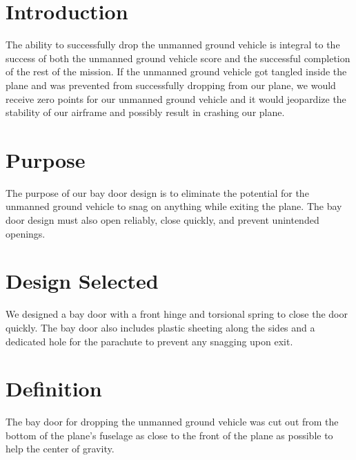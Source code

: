 \documentclass[]{auvsi_doc}
\begin{document}
\begin{AUVSITitlePage}
\begin{artifacttable}
\end{artifacttable}
\end{AUVSITitlePage}

\section{Introduction}

The ability to successfully drop the unmanned ground vehicle is integral to the success of both the unmanned ground vehicle score and the successful completion of the rest of the mission. If the unmanned ground vehicle got tangled inside the plane and was prevented from successfully dropping from our plane, we would receive zero points for our unmanned ground vehicle and it would jeopardize the stability of our airframe and possibly result in crashing our plane.

\section{Purpose}

The purpose of our bay door design is to eliminate the potential for the unmanned ground vehicle to snag on anything while exiting the plane. The bay door design must also open reliably, close quickly, and prevent unintended openings.

\section{Design Selected}

We designed a bay door with a front hinge and torsional spring to close the door quickly. The bay door also includes plastic sheeting along the sides and a dedicated hole for the parachute to prevent any snagging upon exit.

\section{Definition}

The bay door for dropping the unmanned ground vehicle was cut out from the bottom of the plane's fuselage as close to the front of the plane as possible to help the center of gravity.
\end{document}
